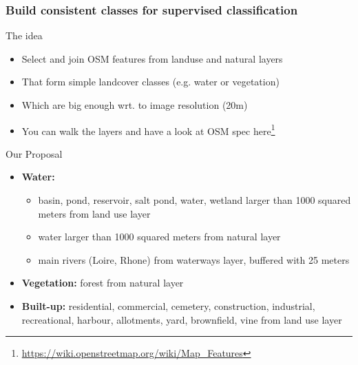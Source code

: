 \documentclass[8pt]{beamer}
\begin{document}
\begin{frame}[fragile]
\frametitle{Build consistent classes for supervised classification}
\begin{block}{The idea}
\begin{itemize}
\item Select and join OSM features from landuse and natural layers
\item That form simple landcover classes (e.g. water or vegetation)
\item Which are big enough wrt. to image resolution (20m)
\item You can walk the layers and have a look at OSM spec here\footnote{\url{https://wiki.openstreetmap.org/wiki/Map_Features}}
\end{itemize}
\end{block}

\begin{block}{Our Proposal}
\begin{itemize}
\item \textbf{Water:} 
  \begin{itemize}
  \item basin, pond, reservoir, salt pond, water, wetland larger than 1000 squared meters from land use layer
  \item water larger than 1000 squared meters from natural layer
  \item main rivers (Loire, Rhone) from waterways layer, buffered with 25 meters
  \end{itemize}
\item \textbf{Vegetation:} forest from natural layer
\item \textbf{Built-up:} residential, commercial, cemetery, construction, industrial, recreational, harbour, allotments, yard, brownfield, vine from land use layer
\end{itemize}
\end{block}

\end{frame}
\end{document}
